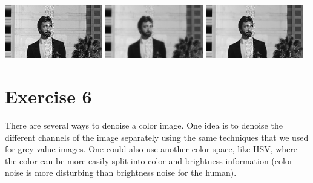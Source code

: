 \documentclass[a4paper,11pt, final]{scrartcl}
\begin{document}
{
\centering 
\includegraphics[width=0.32\textwidth]{ex5_image_noise.png}
\includegraphics[width=0.32\textwidth]{ex5_image_mrf_gaussian_filtered.png}
\includegraphics[width=0.32\textwidth]{ex5_image_mrf_student_filtered.png}
}

\section*{Exercise 6}
There are several ways to denoise a color image.
One idea is to denoise the different channels of the image separately using the same techniques that we used for grey value images.
One could also use another color space, like HSV, where the color can be more easily split into color and brightness information (color noise is more disturbing than brightness noise for the human). 
\end{document}
